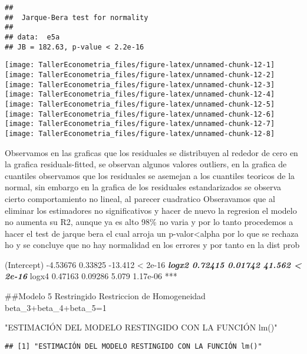 \documentclass[
]{article}
\newenvironment{Shaded}{\begin{snugshade}}{\end{snugshade}}
\newcommand{\StringTok}[1]{\textcolor[rgb]{0.31,0.60,0.02}{#1}}
\begin{document}
\begin{verbatim}
## 
##  Jarque-Bera test for normality
## 
## data:  e5a
## JB = 182.63, p-value < 2.2e-16
\end{verbatim}

\begin{center}\texttt{[image: TallerEconometria\_files/figure-latex/unnamed-chunk-12-1]} \texttt{[image: TallerEconometria\_files/figure-latex/unnamed-chunk-12-2]} \texttt{[image: TallerEconometria\_files/figure-latex/unnamed-chunk-12-3]} \texttt{[image: TallerEconometria\_files/figure-latex/unnamed-chunk-12-4]} \texttt{[image: TallerEconometria\_files/figure-latex/unnamed-chunk-12-5]} \texttt{[image: TallerEconometria\_files/figure-latex/unnamed-chunk-12-6]} \texttt{[image: TallerEconometria\_files/figure-latex/unnamed-chunk-12-7]} \texttt{[image: TallerEconometria\_files/figure-latex/unnamed-chunk-12-8]} \end{center}

Observamos en las graficas que los residuales se distribuyen al rededor
de cero en la grafica residuals-fitted, se observan algunos valores
outliers, en la grafica de cuantiles observamos que los residuales se
asemejan a los cuantiles teoricos de la normal, sin embargo en la
grafica de los residuales estandarizados se observa cierto
comportamiento no lineal, al parecer cuadratico Obseravamos que al
eliminar los estimadores no significativos y hacer de nuevo la regresion
el modelo no aumenta su R2, aunque ya es alto 98\% no varia y por lo
tanto procedemos a hacer el test de jarque bera el cual arroja un
p-valor\textless alpha por lo que se rechaza ho y se concluye que no hay
normalidad en los errores y por tanto en la dist prob

(Intercept) -4.53676 0.33825 -13.412 \textless{} 2e-16 \textbf{\emph{
logx2 0.72415 0.01742 41.562 \textless{} 2e-16 }} logx4 0.47163 0.09286
5.079 1.17e-06 ***

\#\#Modelo 5 Restringido Restriccion de Homogeneidad
beta\_3+beta\_4+beta\_5=1

\begin{Shaded}
\begin{Highlighting}[]
\StringTok{"ESTIMACIÓN DEL MODELO RESTINGIDO CON LA FUNCIÓN lm()"}
\end{Highlighting}
\end{Shaded}

\begin{verbatim}
## [1] "ESTIMACIÓN DEL MODELO RESTINGIDO CON LA FUNCIÓN lm()"
\end{verbatim}
\end{document}
